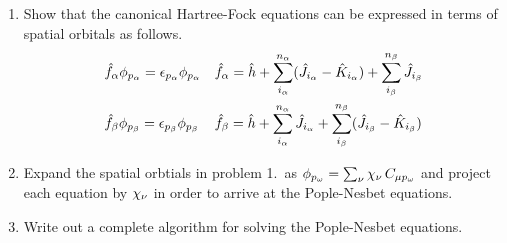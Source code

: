 \documentclass[11pt]{article}
\numberwithin{equation}{section}
\begin{document}
\begin{enumerate}
\item
  Show that the canonical Hartree-Fock equations can be expressed in terms of spatial orbitals as follows.
  \begin{align*}
  &
    \hat{f}_{\alpha } \phi _{p_{\alpha }}
  =
    \epsilon _{p_{\alpha }} \phi _{p_{\alpha }}
  &&
    \hat{f}_{\alpha }
  =
    \hat{h}
  +
    \sum_{i_{\alpha }}^{n_{\alpha }}
    (\hat{J}_{i_{\alpha }} - \hat{K}_{i_{\alpha }})
  +
    \sum_{i_{\beta }}^{n_{\beta }}
    \hat{J}_{i_{\beta }}
  \\
  &
    \hat{f}_{\beta } \phi _{p_{\beta }}
  =
    \epsilon _{p_{\beta }} \phi _{p_{\beta }}
  &&
    \hat{f}_{\beta }
  =
    \hat{h}
  +
    \sum_{i_{\alpha }}^{n_{\alpha }}
    \hat{J}_{i_{\alpha }}
  +
    \sum_{i_{\beta }}^{n_{\beta }}
    (\hat{J}_{i_{\beta }} - \hat{K}_{i_{\beta }})
  \end{align*}

\item
  Expand the spatial orbtials in problem 1.~as
  $
    \f_{p_\w}
  =
    \sum_\nu
    \x_\nu\,
    C_{\mu p_\w}
  $
  and project each equation by $\x_\nu$ in order to arrive at the Pople-Nesbet equations.

\item
  Write out a complete algorithm for solving the Pople-Nesbet equations.
\end{enumerate}
\end{document}
